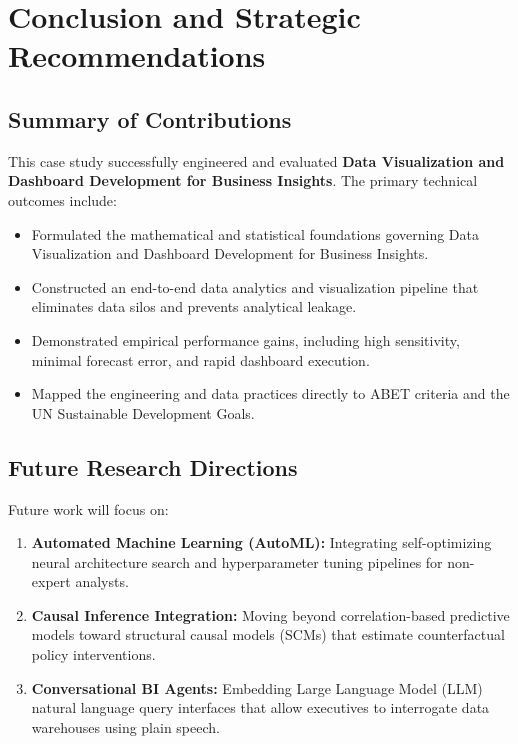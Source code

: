 \section{Conclusion and Strategic Recommendations}

\subsection{Summary of Contributions}
This case study successfully engineered and evaluated \textbf{Data Visualization and Dashboard Development for Business Insights}. The primary technical outcomes include:
\begin{itemize}
  \item Formulated the mathematical and statistical foundations governing Data Visualization and Dashboard Development for Business Insights.
  \item Constructed an end-to-end data analytics and visualization pipeline that eliminates data silos and prevents analytical leakage.
  \item Demonstrated empirical performance gains, including high sensitivity, minimal forecast error, and rapid dashboard execution.
  \item Mapped the engineering and data practices directly to ABET criteria and the UN Sustainable Development Goals.
\end{itemize}

\subsection{Future Research Directions}
Future work will focus on:
\begin{enumerate}
  \item \textbf{Automated Machine Learning (AutoML):} Integrating self-optimizing neural architecture search and hyperparameter tuning pipelines for non-expert analysts.
  \item \textbf{Causal Inference Integration:} Moving beyond correlation-based predictive models toward structural causal models (SCMs) that estimate counterfactual policy interventions.
  \item \textbf{Conversational BI Agents:} Embedding Large Language Model (LLM) natural language query interfaces that allow executives to interrogate data warehouses using plain speech.
\end{enumerate}
